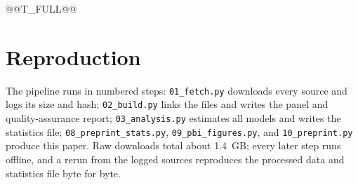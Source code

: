 \documentclass[aps,prd,reprint,superscriptaddress,nofootinbib,floatfix]{revtex4-2}
\begin{document}
@@T_FULL@@

\section{Reproduction}\label{app:repro}

The pipeline runs in numbered steps: \texttt{01\_fetch.py} downloads every source and logs its size and hash; \texttt{02\_build.py} links the files and writes the panel and quality-assurance report; \texttt{03\_analysis.py} estimates all models and writes the statistics file; \texttt{08\_preprint\_stats.py}, \texttt{09\_pbi\_figures.py}, and \texttt{10\_preprint.py} produce this paper. Raw downloads total about 1.4~GB; every later step runs offline, and a rerun from the logged sources reproduces the processed data and statistics file byte for byte.

\end{document}
